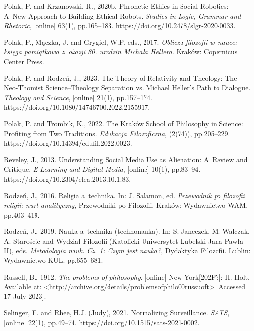 Polak, P. and Krzanowski, R., 2020b. Phronetic Ethics in Social Robotics: A~New Approach to Building Ethical Robots. \textit{Studies in Logic, Grammar and Rhetoric}, [online] 63(1), pp.165–183. https://doi.org/10.2478/slgr-2020-0033.



Polak, P., Mączka, J. and Grygiel, W.P. eds., 2017. \textit{Oblicza filozofii w~nauce: księga pamiątkowa z~okazji 80. urodzin Michała Hellera}. Kraków: Copernicus Center Press.



Polak, P. and Rodzeń, J., 2023. The Theory of Relativity and Theology: The Neo-Thomist Science–Theology Separation vs. Michael Heller's Path to Dialogue. \textit{Theology and Science}, [online] 21(1), pp.157–174. https://doi.org/10.1080/14746700.2022.2155917.



Polak, P. and Trombik, K., 2022. The Kraków School of Philosophy in Science: Profiting from Two Traditions. \textit{Edukacja Filozoficzna}, (2(74)), pp.205–229. https://doi.org/10.14394/edufil.2022.0023.



Reveley, J., 2013. Understanding Social Media Use as Alienation: A~Review and Critique. \textit{E-Learning and Digital Media}, [online] 10(1), pp.83–94. https://doi.org/10.2304/elea.2013.10.1.83.



Rodzeń, J., 2016. Religia a~technika. In: J. Salamon, ed. \textit{Przewodnik po filozofii religii: nurt analityczny}, Przewodniki po Filozofii. Kraków: Wydawnictwo WAM. pp.403–419.



Rodzeń, J., 2019. Nauka a~technika (technonauka). In: S. Janeczek, M. Walczak, A. Starościc and Wydział Filozofii (Katolicki Uniwersytet Lubelski Jana Pawła II), eds. \textit{Metodologia nauk. Cz. 1: Czym jest nauka?}, Dydaktyka Filozofii. Lublin: Wydawnictwo KUL. pp.655–681.



Russell, B., 1912. \textit{The problems of philosophy}. [online] New York[202F?]: H. Holt. Available at: {\textless}http://archive.org/details/problemsofphilo00russuoft{\textgreater} [Accessed 17 July 2023].



Selinger, E. and Rhee, H.J. (Judy), 2021. Normalizing Surveillance. \textit{SATS}, [online] 22(1), pp.49–74. https://doi.org/10.1515/sats-2021-0002.



